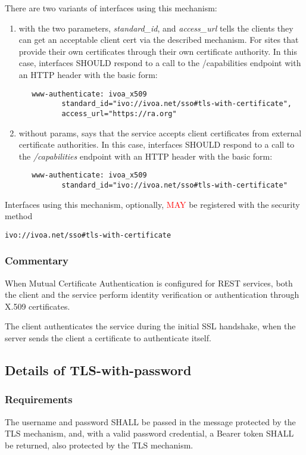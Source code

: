 \documentclass[11pt,a4paper]{ivoa}
\begin{document}
There are two variants of interfaces using this mechanism: 
\begin{enumerate}
\item with the two
parameters, \emph{standard\_id}, and \emph{access\_url} tells the 
clients they can get an acceptable client
cert via the described mechanism. For sites that provide their own
certificates through their own certificate authority. In this case,
interfaces SHOULD respond to a call to the 
/capabilities endpoint with an HTTP header with the basic form:
\begin{verbatim}
   www-authenticate: ivoa_x509 
          standard_id="ivo://ivoa.net/sso#tls-with-certificate",
          access_url="https://ra.org"
\end{verbatim}
\item without params, says that the service accepts client certificates
from external certificate authorities. In this case,
interfaces SHOULD respond to a call to the 
\emph{/capabilities} endpoint with an HTTP header with the basic form:
\begin{verbatim}
   www-authenticate: ivoa_x509 
          standard_id="ivo://ivoa.net/sso#tls-with-certificate"
\end{verbatim}
\end{enumerate}

Interfaces using this mechanism, optionally, \textcolor{red}{MAY} be  
registered with the security method

\texttt{ivo://ivoa.net/sso\#tls-with-certificate}

\subsubsection{Commentary}
When Mutual Certificate Authentication is configured for REST services,
both the client and the service perform
identity verification or authentication through X.509 certificates.

The client authenticates the service during the initial SSL handshake,
when the server sends the client a certificate to authenticate itself.

\subsection{Details of TLS-with-password}
\subsubsection{Requirements}
The username and password SHALL be passed in the message protected by
the TLS mechanism, and, with a valid password credential, a Bearer token
SHALL be returned, also protected by the TLS mechanism.
\end{document}
